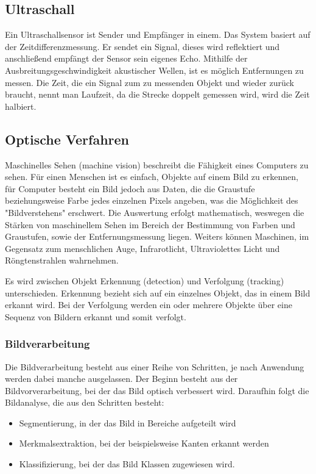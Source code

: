     \subsection*{Ultraschall}
    Ein Ultraschallsensor ist Sender und Empfänger in einem. Das System basiert auf der Zeitdifferenzmessung. Er sendet ein Signal, dieses wird reflektiert und anschließend empfängt der Sensor sein eigenes Echo. Mithilfe der Ausbreitungsgeschwindigkeit akustischer Wellen, ist es möglich Entfernungen zu messen. Die Zeit, die ein Signal zum zu messenden Objekt und wieder zurück braucht, nennt man Laufzeit, da die Strecke doppelt gemessen wird, wird die Zeit halbiert.

    \subsection{Optische Verfahren}
    Maschinelles Sehen (machine vision) beschreibt die Fähigkeit eines Computers zu sehen.
    Für einen Menschen ist es einfach, Objekte auf einem Bild zu erkennen, für Computer besteht ein Bild jedoch aus Daten, die die Graustufe beziehungsweise Farbe jedes einzelnen Pixels angeben, was die Möglichkeit des "Bildverstehens" erschwert.
    Die Auswertung erfolgt mathematisch, weswegen die Stärken von maschinellem Sehen im Bereich der Bestimmung von Farben und Graustufen, sowie der Entfernungsmessung liegen. Weiters können Maschinen, im Gegensatz zum menschlichen Auge, Infrarotlicht, Ultraviolettes Licht und Röngtenstrahlen wahrnehmen. \cite{machinevision} \cite{machinevision2}

    Es wird zwischen Objekt Erkennung (detection) und Verfolgung (tracking) unterschieden. Erkennung bezieht sich auf ein einzelnes Objekt, das in einem Bild erkannt wird. Bei der Verfolgung werden ein oder mehrere Objekte über eine Sequenz von Bildern erkannt und somit verfolgt.
    \cite{obj_det_trak}

    \subsubsection{Bildverarbeitung}
    Die Bildverarbeitung besteht aus einer Reihe von Schritten, je nach Anwendung werden dabei manche ausgelassen.
    Der Beginn besteht aus der Bildvorverarbeitung, bei der das Bild optisch verbessert wird. Daraufhin folgt die Bildanalyse, die aus den Schritten besteht: \cite{Bildverarbeitung} \cite{Bildverarbeitung2}
    \begin{itemize}
    \item Segmentierung, in der das Bild in Bereiche aufgeteilt wird
    \item Merkmalsextraktion, bei der beispielsweise Kanten erkannt werden
    \item Klassifizierung, bei der das Bild Klassen zugewiesen wird.
    \end{itemize}

